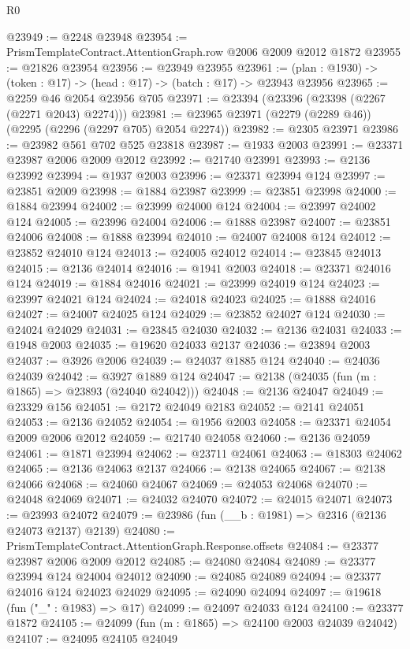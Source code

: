 \begin{lexlean}{R0}
\begin{coremodule}
@23949 := @2248 @23948
@23954 := PrismTemplateContract.AttentionGraph.row @2006 @2009 @2012 @1872
@23955 := @21826 @23954
@23956 := @23949 @23955
@23961 := (plan : @1930) -> (token : @17) -> (head : @17) -> (batch : @17) -> @23943 @23956
@23965 := @2259 @46 @2054 @23956 @705
@23971 := @23394 (@23396 (@23398 (@2267 (@2271 @2043) @2274)))
@23981 := @23965 @23971 (@2279 (@2289 @46)) (@2295 (@2296 (@2297 @705) @2054 @2274))
@23982 := @2305 @23971
@23986 := @23982 @561 @702 @525 @23818
@23987 := @1933 @2003
@23991 := @23371 @23987 @2006 @2009 @2012
@23992 := @21740 @23991
@23993 := @2136 @23992
@23994 := @1937 @2003
@23996 := @23371 @23994 @124
@23997 := @23851 @2009
@23998 := @1884 @23987
@23999 := @23851 @23998
@24000 := @1884 @23994
@24002 := @23999 @24000 @124
@24004 := @23997 @24002 @124
@24005 := @23996 @24004
@24006 := @1888 @23987
@24007 := @23851 @24006
@24008 := @1888 @23994
@24010 := @24007 @24008 @124
@24012 := @23852 @24010 @124
@24013 := @24005 @24012
@24014 := @23845 @24013
@24015 := @2136 @24014
@24016 := @1941 @2003
@24018 := @23371 @24016 @124
@24019 := @1884 @24016
@24021 := @23999 @24019 @124
@24023 := @23997 @24021 @124
@24024 := @24018 @24023
@24025 := @1888 @24016
@24027 := @24007 @24025 @124
@24029 := @23852 @24027 @124
@24030 := @24024 @24029
@24031 := @23845 @24030
@24032 := @2136 @24031
@24033 := @1948 @2003
@24035 := @19620 @24033 @2137
@24036 := @23894 @2003
@24037 := @3926 @2006
@24039 := @24037 @1885 @124
@24040 := @24036 @24039
@24042 := @3927 @1889 @124
@24047 := @2138 (@24035 (fun (m : @1865) => @23893 (@24040 @24042)))
@24048 := @2136 @24047
@24049 := @23329 @156
@24051 := @2172 @24049 @2183
@24052 := @2141 @24051
@24053 := @2136 @24052
@24054 := @1956 @2003
@24058 := @23371 @24054 @2009 @2006 @2012
@24059 := @21740 @24058
@24060 := @2136 @24059
@24061 := @1871 @23994
@24062 := @23711 @24061
@24063 := @18303 @24062
@24065 := @2136 @24063 @2137
@24066 := @2138 @24065
@24067 := @2138 @24066
@24068 := @24060 @24067
@24069 := @24053 @24068
@24070 := @24048 @24069
@24071 := @24032 @24070
@24072 := @24015 @24071
@24073 := @23993 @24072
@24079 := @23986 (fun (__b : @1981) => @2316 (@2136 @24073 @2137) @2139)
@24080 := PrismTemplateContract.AttentionGraph.Response.offsets
@24084 := @23377 @23987 @2006 @2009 @2012
@24085 := @24080 @24084
@24089 := @23377 @23994 @124 @24004 @24012
@24090 := @24085 @24089
@24094 := @23377 @24016 @124 @24023 @24029
@24095 := @24090 @24094
@24097 := @19618 (fun ("_" : @1983) => @17)
@24099 := @24097 @24033 @124
@24100 := @23377 @1872
@24105 := @24099 (fun (m : @1865) => @24100 @2003 @24039 @24042)
@24107 := @24095 @24105 @24049

\end{coremodule}
\end{lexlean}
